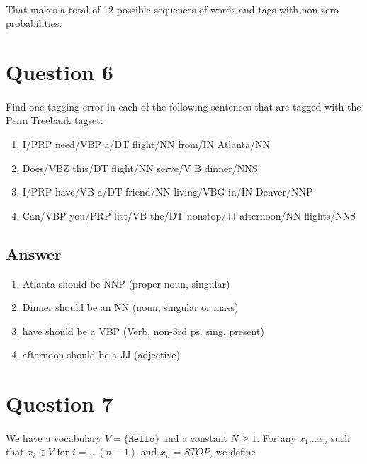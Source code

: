 \documentclass{article}
\begin{document}
\paragraph{} That makes a total of 12 possible sequences of words and tags with non-zero probabilities.

\clearpage

\section*{Question 6}

\paragraph{} Find one tagging error in each of the following sentences that are tagged with the Penn Treebank tagset:

\begin{enumerate}
    \item I/PRP need/VBP a/DT flight/NN from/IN Atlanta/NN
    \item Does/VBZ this/DT flight/NN serve/V B dinner/NNS
    \item I/PRP have/VB a/DT friend/NN living/VBG in/IN Denver/NNP
    \item Can/VBP you/PRP list/VB the/DT nonstop/JJ afternoon/NN flights/NNS
\end{enumerate}

\subsection*{Answer}

\begin{enumerate}
    \item Atlanta should be NNP (proper noun, singular)
    \item Dinner should be an NN (noun, singular or mass)
    \item have should be a VBP (Verb, non-3rd ps. sing. present)
    \item afternoon should be a JJ (adjective)
\end{enumerate}

\clearpage

\section*{Question 7}

\paragraph{} We have a vocabulary $V = \{\texttt{Hello}\}$ and a constant $N \ge 1$. For any $x_1 \dots x_n$ such that $x_i \in V$ for $i = \dots (n-1)$ and $x_n = STOP$, we define
\end{document}

